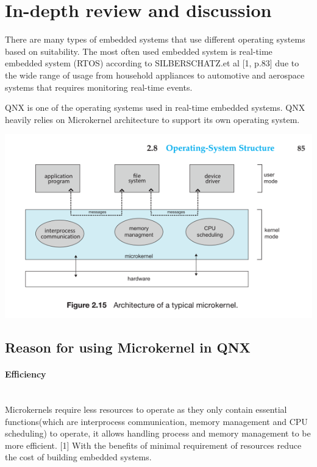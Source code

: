 \documentclass[conference]{IEEEtran}
\begin{document}
\section{In-depth review and discussion}
There are many types of embedded systems that use different operating systems based on suitability. The most often used embedded system is real-time embedded system (RTOS) according to SILBERSCHATZ.et al [1, p.83] due to the wide range of usage from household appliances to automotive and aerospace systems that requires monitoring real-time events.

QNX is one of the operating systems used in real-time embedded systems. QNX heavily relies on Microkernel architecture to support its own operating system.

\begin{center}
\includegraphics[scale=0.4]{./images/QNX_OS.png}
\end{center}
\subsection{Reason for using Microkernel in QNX}
\paragraph{Efficiency}\mbox{} \\
Microkernels require less resources to operate as they only contain essential functions(which are interprocess communication, memory management and CPU scheduling) to operate, it allows handling process and memory management to be more efficient. [1] With the benefits of minimal requirement of resources reduce the cost of building embedded systems.
\\
\end{document}
